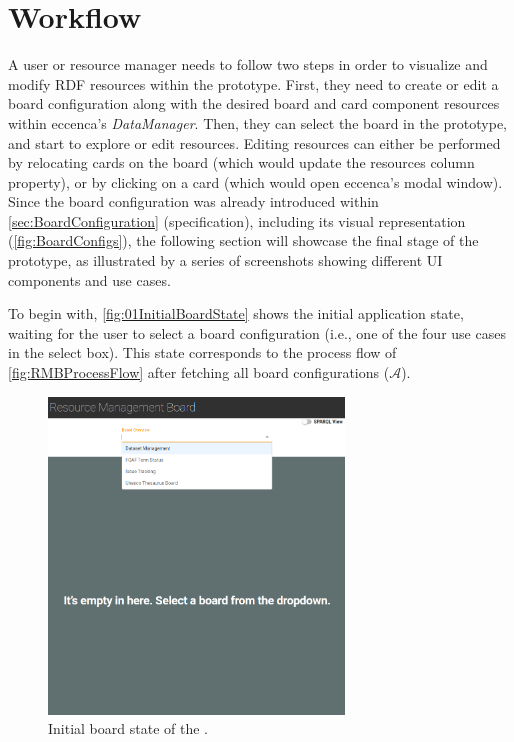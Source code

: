 \section{Workflow}\label{sec:Workflow}

\noindent A user or resource manager needs to follow two steps in order to visualize and modify \acrshort*{RDF} resources within the prototype. First, they need to create or edit a board configuration along with the desired board and card component resources within eccenca’s \textit{DataManager}. Then, they can select the board in the prototype, and start to explore or edit resources. Editing resources can either be performed by relocating cards on the board (which would update the resources column property), or by clicking on a card (which would open eccenca’s  modal window). Since the board configuration was already introduced within \autoref{sec:BoardConfiguration} (specification), including its visual representation (\autoref{fig:BoardConfigs}), the following section will showcase the final stage of the prototype, as illustrated by a series of screenshots showing different \acrshort*{UI} components and use cases.

To begin with, \autoref{fig:01InitialBoardState} shows the initial application state, waiting for the user to select a board configuration (i.e., one of the four use cases in the select box). This state corresponds to the process flow of \autoref{fig:RMBProcessFlow} after fetching all board configurations ({\small \hyperref[ssec:QS-A]{\(\mathcal{A}\)}}).



\begin{figure}[H]
\centering
\includegraphics[width=0.7\textwidth]{img/01-InitialBoard.png}
	\caption[ — Initial Board State]{Initial board state of the . }
	\label{fig:01InitialBoardState}
\end{figure}

